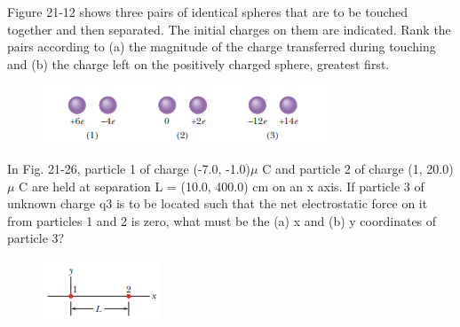 \documentclass[11pt]{exam}
\begin{document}
\newpage 


\begin{questions}





\addpoints
\question[10] Figure 21-12 shows three pairs of identical spheres that are to be touched together and then separated. The initial charges on them are indicated. Rank the pairs according to (a) the magnitude of the charge transferred during touching and (b)  the charge left on the positively charged sphere, greatest first.\begin{figure}[H]
\centering
\includegraphics[scale=0.8]{assets/Halliday_ch21q2.png}
\end{figure}
\newpage

\addpoints
\question[10] In Fig. 21-26, particle 1 of charge (-7.0, -1.0)$\mu$ C and particle  2 of charge (1, 20.0)$\mu$ C are held at separation L = (10.0, 400.0) cm on an x axis. If particle 3 of unknown charge q3 is to be located such that the net electrostatic force on it from particles 1 and 2 is zero, what must be the (a) x and (b) y coordinates of particle 3?\begin{figure}[H]
\centering
\includegraphics[scale=0.8]{assets/Halliday_ch21p13.png}
\end{figure}
\newpage


\end{questions}
\end{document}
